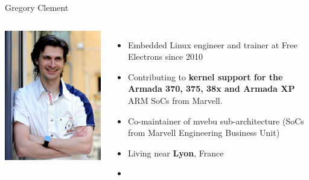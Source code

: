 \begin{frame}{Gregory Clement}
 \begin{columns}
    \includegraphics[width=\textwidth]{slides/first-slides/gregory-clement.jpg}
    \begin{itemize}
	\item Embedded Linux engineer and trainer at Free Electrons since 2010
  	\item Contributing to {\bf kernel support for the Armada 370, 375, 38x and
      	      Armada XP} ARM SoCs from Marvell.
  	\item Co-maintainer of mvebu sub-architecture (SoCs from Marvell
    	      Engineering Business Unit)
  	\item Living near {\bf Lyon}, France
    	\item {}
    \end{itemize}
 \end{columns}
\end{frame}
